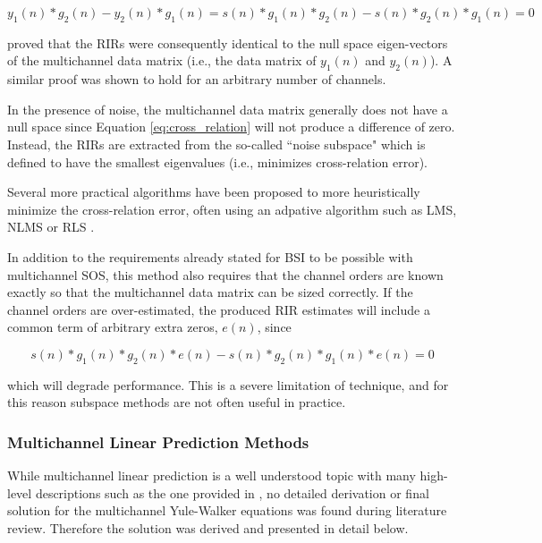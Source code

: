\noindent
\begin{equation}
	y_1(n)*g_2(n) - y_2(n)*g_1(n) = s(n)*g_1(n)*g_2(n) - s(n)*g_2(n)*g_1(n) = 0 \label{eq:cross_relation}
\end{equation}

\cite{gurelli1995evam} proved that the RIRs were consequently identical to the null space eigen-vectors of the multichannel data matrix (i.e., the data matrix of $y_1(n)$ and $y_2(n)$). A similar proof was shown to hold for an arbitrary number of channels. 

In the presence of noise, the multichannel data matrix generally does not have a null space since Equation \ref{eq:cross_relation} will not produce a difference of zero. Instead, the RIRs are extracted from the so-called ``noise subspace" which is defined to have the smallest eigenvalues (i.e., minimizes cross-relation error).

Several more practical algorithms have been proposed to more heuristically minimize the cross-relation error, often using an adpative algorithm such as LMS, NLMS or RLS \citep[][]{identification1995least, huang2003class, huang2002adaptive}.

In addition to the requirements already stated for BSI to be possible with multichannel SOS, this method also requires that the channel orders are known exactly so that the multichannel data matrix can be sized correctly. If the channel orders are over-estimated, the produced RIR estimates will include a common term of arbitrary extra zeros, $e(n)$, since

\begin{equation}
	s(n)*g_1(n)*g_2(n)*e(n) - s(n)*g_2(n)*g_1(n)*e(n) = 0
\end{equation}

\noindent
which will degrade performance. This is a severe limitation of technique, and for this reason subspace methods are not often useful in practice.


\subsubsection{Multichannel Linear Prediction Methods}  \label{section_dap}

While multichannel linear prediction is a well understood topic with many high-level descriptions such as the one provided in \cite{naylor2010speech}, no detailed derivation or final solution for the multichannel Yule-Walker equations was found during literature review. Therefore the solution was derived and presented in detail below.

